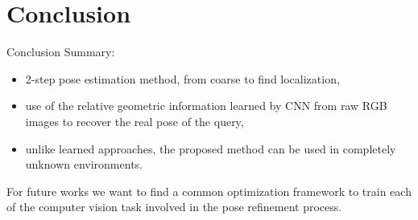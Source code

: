 \section{Conclusion}

\label{sec:conclusion}

\begin{frame}{Conclusion}
	Summary:
	\begin{itemize}
		\item 2-step pose estimation method, from coarse to find localization,
		\item use of the relative geometric information learned by CNN from raw RGB images to recover the real pose of the query,
		\item unlike learned approaches, the proposed method can be used in completely unknown environments.
	\end{itemize}

	\vfill
	
	{
	For future works we want to find a common optimization framework to train each of the computer vision task involved in the pose refinement process.
	}
\end{frame}
